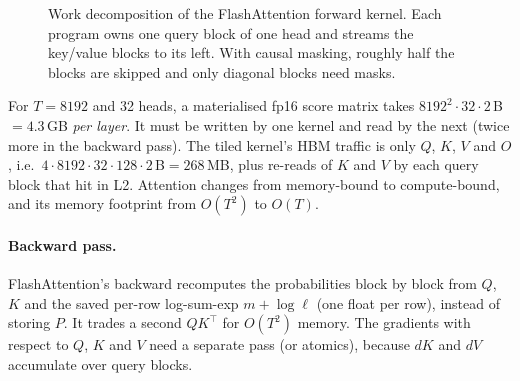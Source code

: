 \begin{figure}[t]
\centering
{}
\caption{Work decomposition of the FlashAttention forward kernel. Each program owns one
query block of one head and streams the key/value blocks to its left. With causal
masking, roughly half the blocks are skipped and only diagonal blocks need masks.}
\label{fig:triton:flash}
\end{figure}

\begin{napkinmath}
For $T=8192$ and 32 heads, a materialised fp16 score matrix takes
$8192^2\cdot32\cdot2$\,B$=4.3$\,GB \emph{per layer}. It must be written by one kernel and
read by the next (twice more in the backward pass). The tiled kernel's HBM traffic is
only $Q$, $K$, $V$ and $O$, i.e.\ $4\cdot8192\cdot32\cdot128\cdot2$\,B$=268$\,MB, plus
re-reads of $K$ and $V$ by each query block that hit in L2. Attention changes from
memory-bound to compute-bound, and its memory footprint from $O(T^2)$ to $O(T)$.
\end{napkinmath}

\paragraph{Backward pass.} FlashAttention's backward recomputes the probabilities block by
block from $Q$, $K$ and the saved per-row log-sum-exp $m+\log\ell$ (one float per row),
instead of storing $P$. It trades a second $QK^\top$ for $O(T^2)$ memory. The
gradients with respect to $Q$, $K$ and $V$ need a separate pass (or atomics), because
$dK$ and $dV$ accumulate over query blocks.

